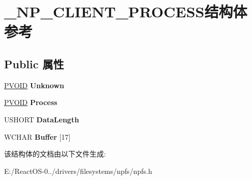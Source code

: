 \hypertarget{struct___n_p___c_l_i_e_n_t___p_r_o_c_e_s_s}{}\section{\+\_\+\+N\+P\+\_\+\+C\+L\+I\+E\+N\+T\+\_\+\+P\+R\+O\+C\+E\+S\+S结构体 参考}
\label{struct___n_p___c_l_i_e_n_t___p_r_o_c_e_s_s}
\subsection*{Public 属性}
\begin{DoxyCompactItemize}
\item 
\mbox{\label{struct___n_p___c_l_i_e_n_t___p_r_o_c_e_s_s_a17c61b3594a063f561123809024c0fb7}} 
\hyperlink{interfacevoid}{P\+V\+O\+ID} {\bfseries Unknown}
\item 
\mbox{\label{struct___n_p___c_l_i_e_n_t___p_r_o_c_e_s_s_a3ada918405e36519596da7188db4ec4a}} 
\hyperlink{interfacevoid}{P\+V\+O\+ID} {\bfseries Process}
\item 
\mbox{\label{struct___n_p___c_l_i_e_n_t___p_r_o_c_e_s_s_a5d15d1b3d9fb7c2d3d0cbe6a689edb2d}} 
U\+S\+H\+O\+RT {\bfseries Data\+Length}
\item 
\mbox{\label{struct___n_p___c_l_i_e_n_t___p_r_o_c_e_s_s_afacc6bdf1d0d9da09431ac0f40698610}} 
W\+C\+H\+AR {\bfseries Buffer} \mbox{[}17\mbox{]}
\end{DoxyCompactItemize}


该结构体的文档由以下文件生成\+:\begin{DoxyCompactItemize}
\item 
E\+:/\+React\+O\+S-\/0../drivers/filesystems/npfs/npfs.\+h\end{DoxyCompactItemize}
